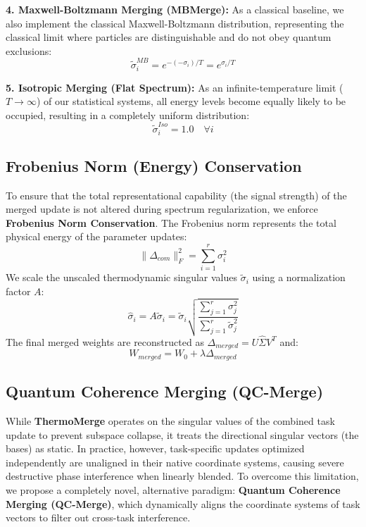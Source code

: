 \documentclass{article}
\theoremstyle{plain}
\theoremstyle{definition}
\theoremstyle{remark}
\begin{document}
\textbf{4. Maxwell-Boltzmann Merging (MBMerge):}
As a classical baseline, we also implement the classical Maxwell-Boltzmann distribution, representing the classical limit where particles are distinguishable and do not obey quantum exclusions:
\begin{equation}
    \tilde{\sigma}_i^{MB} = e^{-(-\sigma_i)/T} = e^{\sigma_i/T}
\end{equation}

\textbf{5. Isotropic Merging (Flat Spectrum):}
As an infinite-temperature limit ($T \to \infty$) of our statistical systems, all energy levels become equally likely to be occupied, resulting in a completely uniform distribution:
\begin{equation}
    \tilde{\sigma}_i^{Iso} = 1.0 \quad \forall i
\end{equation}

\subsection{Frobenius Norm (Energy) Conservation}
To ensure that the total representational capability (the signal strength) of the merged update is not altered during spectrum regularization, we enforce \textbf{Frobenius Norm Conservation}. The Frobenius norm represents the total physical energy of the parameter updates:
\begin{equation}
    \| \Delta_{com} \|_F^2 = \sum_{i=1}^r \sigma_i^2
\end{equation}
We scale the unscaled thermodynamic singular values $\tilde{\sigma}_i$ using a normalization factor $A$:
\begin{equation}
    \hat{\sigma}_i = A \tilde{\sigma}_i = \tilde{\sigma}_i \sqrt{\frac{\sum_{j=1}^r \sigma_j^2}{\sum_{j=1}^r \tilde{\sigma}_j^2}}
\end{equation}
The final merged weights are reconstructed as $\Delta_{merged} = U \hat{\Sigma} V^T$ and:
\begin{equation}
    W_{merged} = W_0 + \lambda \Delta_{merged}
\end{equation}

\subsection{Quantum Coherence Merging (QC-Merge)}
While \textbf{ThermoMerge} operates on the singular values of the combined task update to prevent subspace collapse, it treats the directional singular vectors (the bases) as static. In practice, however, task-specific updates optimized independently are unaligned in their native coordinate systems, causing severe destructive phase interference when linearly blended. To overcome this limitation, we propose a completely novel, alternative paradigm: \textbf{Quantum Coherence Merging (QC-Merge)}, which dynamically aligns the coordinate systems of task vectors to filter out cross-task interference.
\end{document}

